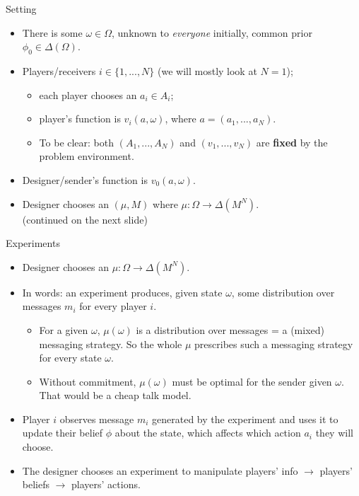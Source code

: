 \documentclass[english,10pt
,aspectratio=169
]{beamer}
\begin{document}
\begin{frame}{Setting}
\begin{itemize}
	\item There is some  $\omega \in \Omega$, unknown to \emph{everyone} initially, common prior $\phi_0 \in \varDelta(\Omega)$.
	\item \alert{Players/receivers} $i \in \{1,...,N\}$ (we will mostly look at $N=1$);
	\begin{itemize}
		\item each player chooses an  $a_i \in A_i$;
		\item player's  function is $v_i(a, \omega)$, where $a = (a_1, ..., a_N)$.
		\item To be clear: both $(A_1,...,A_N)$ and $(v_1,...,v_N)$ are \textbf{fixed} by the problem environment.
	\end{itemize}
	\item \alert{Designer/sender's}  function is $v_0(a, \omega)$.
	\item Designer chooses an  $(\mu,M)$ where $\mu: \Omega \to \varDelta(M^N)$. 
	\\ (continued on the next slide)
\end{itemize}
\end{frame}


\begin{frame}{Experiments}
\begin{itemize}
	\item Designer chooses an  $\mu: \Omega \to \varDelta(M^N)$.
	\item In words: an experiment produces, given state $\omega$, some distribution over messages $m_i$ for every player $i$.
	\begin{itemize}
		\item For a given $\omega$, $\mu(\omega)$ is a distribution over messages = a (mixed) messaging strategy. So the whole $\mu$ prescribes such a messaging strategy for every state $\omega$.
		\item Without commitment, $\mu(\omega)$ must be optimal for the sender given $\omega$. That would be a cheap talk model.
	\end{itemize}
	\item Player $i$ observes message $m_i$ generated by the experiment and uses it to update their belief $\phi$ about the state, which affects which action $a_i$ they will choose.
	\item The designer chooses an experiment to manipulate players' info $\rightarrow$ players' beliefs $\rightarrow$ players' actions.
\end{itemize}
\end{frame}
\end{document}
